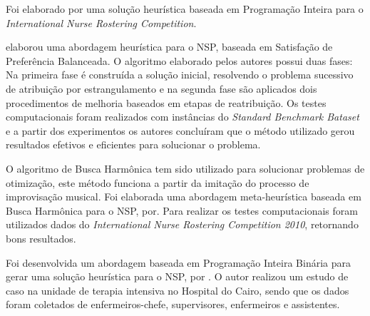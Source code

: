 Foi elaborado por \cite{gambini:2012} uma solução heurística baseada em Programação Inteira para o \textit{International Nurse Rostering Competition}.



\cite{constantino:2011} elaborou uma abordagem heurística para o \ac{NSP}, baseada em Satisfação de Preferência Balanceada. O algoritmo elaborado pelos autores possui duas fases: Na primeira fase é construída a solução inicial, resolvendo o problema sucessivo de atribuição por estrangulamento e na segunda fase são aplicados dois procedimentos de melhoria baseados em etapas de reatribuição. Os testes computacionais foram realizados com instâncias do \textit{Standard Benchmark Bataset} e a partir dos experimentos os autores concluíram que o método utilizado gerou resultados efetivos e eficientes para solucionar o problema.


O algoritmo de Busca Harmônica  tem sido utilizado para solucionar problemas de otimização, este método funciona a partir da imitação do processo de improvisação musical.  Foi elaborada uma abordagem meta-heurística baseada em Busca Harmônica para o \ac{NSP}, por\cite{awadallah:2011}. Para realizar os testes computacionais foram utilizados dados do \textit{ International Nurse Rostering Competition 2010}, retornando bons resultados.

Foi desenvolvida um abordagem baseada em Programação Inteira Binária para gerar uma solução heurística para o \ac{NSP}, por \cite{Zen-El-Din:2012}. O autor realizou um estudo de caso  na unidade de terapia intensiva no Hospital do Cairo, sendo que os dados foram coletados de enfermeiros-chefe, supervisores, enfermeiros e assistentes.


